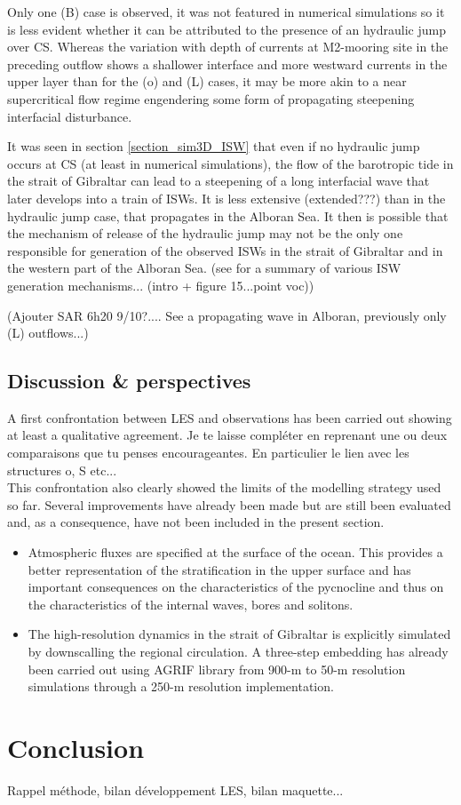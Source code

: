 Only one (B) case is observed, it was not featured in numerical simulations so it is less evident whether it can be attributed to the presence of an hydraulic jump over CS. Whereas the variation with depth of currents at M2-mooring site in the preceding outflow shows a shallower interface and more westward currents in the upper layer than for the (o) and (L) cases, it may be more akin to a near supercritical flow regime engendering some form of propagating steepening interfacial disturbance.

It was seen in section \ref{section_sim3D_ISW} that even if no hydraulic jump occurs at CS (at least in numerical simulations), the flow of the barotropic tide in the strait of Gibraltar can lead to a steepening of a long interfacial wave that later develops into a train of ISWs. \color{blue} It is less extensive (extended???) than in the hydraulic jump case, that propagates in the Alboran Sea. \color{black} It then is possible that the mechanism of release of the hydraulic jump may not be the only one responsible for generation of the observed ISWs in the strait of Gibraltar and in the western part of the Alboran Sea.  \color{green}(see \citet{chen_2017} for a summary of various ISW generation mechanisms... (intro + figure 15...point voc)) 

(Ajouter SAR 6h20 9/10?.... See a propagating wave in Alboran, previously only (L) outflows...)\color{black}

\color{blue}
\subsection{Discussion \& perspectives}

A first confrontation between LES and observations has been carried out showing at least a qualitative agreement.  \color{green}Je te laisse compléter en reprenant une ou deux comparaisons que tu penses encourageantes. En particulier le lien avec les structures o, S etc...\\
\color{blue}This confrontation also clearly showed the limits of the modelling strategy used so far. Several improvements have already been made but are still been evaluated and, as a consequence, have not been included in the present section. 
\begin{itemize}
\item Atmospheric fluxes are specified at the surface of the ocean.  This provides a better representation of the stratification in the upper surface and has important consequences on the characteristics of the pycnocline and thus on the characteristics of the internal waves, bores and solitons.
\item The high-resolution dynamics in the strait of Gibraltar is explicitly simulated by downscalling the regional circulation. A three-step embedding has already been carried out using AGRIF library from 900-m to 50-m resolution simulations through a 250-m resolution implementation.
\end{itemize}
 \color{black}
\color{black}

\section{Conclusion}

\color{green} Rappel méthode, bilan développement LES, bilan maquette...\color{black}